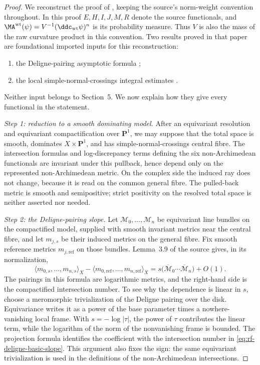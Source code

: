 \begin{proof}
We reconstruct the proof of \cite[Theorem~3.6]{BHJ19}, keeping the
source's norm-weight convention throughout. In this proof $E,H,I,J,M,R$
denote the source functionals, and
$\MA^{\mathrm{wt}}(\psi)=V^{-1}(\ddc_{\mathrm{wt}}\psi)^n$
is its probability measure. Thus $V$ is also the mass of the raw
curvature product in this convention.  Two results proved in that
paper are foundational imported inputs for this reconstruction:

\begin{enumerate}
\item the Deligne-pairing asymptotic formula
      \cite[Lemma~3.9]{BHJ19};
\item the local simple-normal-crossings integral estimates
      \cite[Lemmas~3.10--3.11]{BHJ19}.
\end{enumerate}

Neither input belongs to Section~5.  We now explain how they give every
functional in the statement.

\smallskip
\noindent\emph{Step 1: reduction to a smooth dominating model.}
After an equivariant resolution and equivariant compactification over
$\mathbf P^1$, we may suppose that the total space is smooth, dominates
$X\times\mathbf P^1$, and has simple-normal-crossings central fibre.
The intersection formulas and log-discrepancy terms defining the six
non-Archimedean functionals are invariant under this pullback, hence depend
only on the represented non-Archimedean metric.  On the complex side the
induced ray does not change, because it is read on the common general
fibre.  The pulled-back metric is smooth and semipositive; strict
positivity on the resolved total space is neither asserted nor needed.

\smallskip
\noindent\emph{Step 2: the Deligne-pairing slope.}
Let $\mathcal M_0,\ldots,\mathcal M_n$ be equivariant line bundles on
the compactified model, supplied with smooth invariant metrics near the
central fibre, and let $m_{j,s}$ be their induced metrics on the general
fibre.  Fix smooth reference metrics $m_{j,\mathrm{ref}}$ on those
bundles.  Lemma~3.9 of the source gives, in its normalization,
\[
 \bigl\langle m_{0,s},\ldots,m_{n,s}\bigr\rangle_X
 -\bigl\langle m_{0,\mathrm{ref}},\ldots,
                    m_{n,\mathrm{ref}}\bigr\rangle_X
 =s\bigl(\overline{\mathcal M}_0\cdots
          \overline{\mathcal M}_n\bigr)+O(1).
\tag{65.35}\label{eq:rf-deligne-basic-slope}
\]
The pairings in this formula are logarithmic metrics, and the right-hand
side is the compactified intersection number.  To see why the dependence
is linear in $s$, choose a meromorphic trivialization of the Deligne
pairing over the disk.  Equivariance writes it as a power of the base
parameter times a nowhere-vanishing local frame.  With
$s=-\log|\tau|$, the power of $\tau$ contributes the linear term, while the
logarithm of the norm of the nonvanishing frame is bounded.  The projection
formula identifies the coefficient with the intersection number in
\eqref{eq:rf-deligne-basic-slope}.  This argument also fixes the sign: the
same equivariant trivialization is used in the definitions of the
non-Archimedean intersections.


\end{proof}
